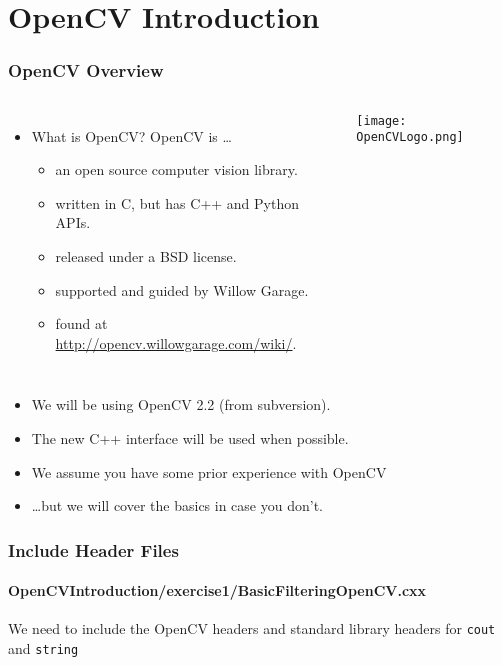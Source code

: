 \section{OpenCV Introduction}




\begin{frame}
\frametitle{OpenCV Overview}
\begin{center}
\begin{columns}[c]
\begin{itemize}
\item What is OpenCV?  OpenCV is \ldots
  \begin{itemize}
  \item an open source computer vision library.
  \item written in C, but has C++ and Python APIs.
  \item released under a BSD license.
  \item supported and guided by Willow Garage.
  \item found at \url{http://opencv.willowgarage.com/wiki/}.
  \end{itemize}
\end{itemize}
 \texttt{[image: OpenCVLogo.png]}
\end{columns}
\pause
\begin{itemize}
\item We will be using OpenCV 2.2 (from subversion).
\item The new C++ interface will be used when possible.
\item We assume you have some prior experience with OpenCV
\item \ldots but we will cover the basics in case you don't.
\end{itemize}
\end{center}
\end{frame}


\begin{frame}
\frametitle{Include Header Files}
\framesubtitle{OpenCVIntroduction/exercise1/BasicFilteringOpenCV.cxx}
\begin{center}
We need to include the OpenCV headers
\pause
\vspace{1 em}
and standard library headers for {\tt cout} and {\tt string}
\end{center}
\end{frame}


